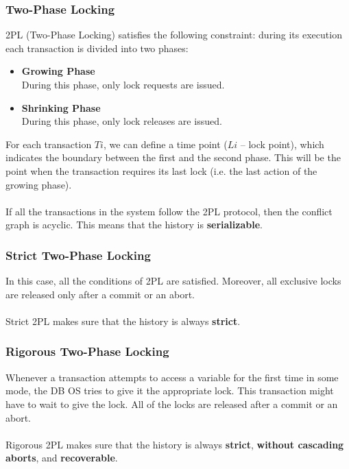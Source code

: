 \documentclass{article}
\begin{document}
\subsubsection{Two-Phase Locking}
2PL (Two-Phase Locking) satisfies the following constraint: during its execution each transaction is divided into two phases:

\begin{itemize}
	\item \textbf{Growing Phase}
	\vspace{.2cm} \\
	During this phase, only lock requests are issued.
	
	\item \textbf{Shrinking Phase}
	\vspace{.2cm} \\
	During this phase, only lock releases are issued.
\end{itemize}
For each transaction $Ti$, we can define a time point ($Li$ -- lock point), which indicates the boundary between the first and the second phase. This will be the point when the transaction requires its last lock (i.e. the last action of the growing phase). \\ \\
If all the transactions in the system follow the 2PL protocol, then the conflict graph is acyclic. This means that the history is \textbf{serializable}.

\subsubsection{Strict Two-Phase Locking}
In this case, all the conditions of 2PL are satisfied. Moreover, all exclusive locks are released only after a commit or an abort. \\ \\
Strict 2PL makes sure that the history is always \textbf{strict}.

\subsubsection{Rigorous Two-Phase Locking}
Whenever a transaction attempts to access a variable for the first time in some mode, the DB OS tries to give it the appropriate lock. This transaction might have to wait to give the lock. All of the locks are released after a commit or an abort. \\ \\
Rigorous 2PL makes sure that the history is always \textbf{strict}, \textbf{without cascading aborts}, and \textbf{recoverable}.
\end{document}
